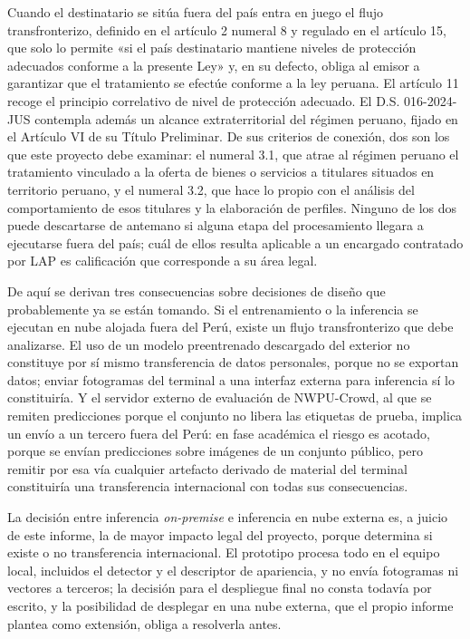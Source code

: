 Cuando el destinatario se sitúa fuera del país entra en juego el flujo
transfronterizo, definido en el artículo 2 numeral 8 y regulado en el
artículo 15, que solo lo permite «si el país destinatario mantiene
niveles de protección adecuados conforme a la presente Ley» y, en su
defecto, obliga al emisor a garantizar que el tratamiento se efectúe
conforme a la ley peruana. El artículo 11 recoge el principio
correlativo de nivel de protección adecuado. El D.S. 016-2024-JUS
contempla además un alcance extraterritorial del régimen peruano, fijado
en el Artículo VI de su Título Preliminar. De sus criterios de conexión,
dos son los que este proyecto debe examinar: el numeral 3.1, que atrae
al régimen peruano el tratamiento vinculado a la oferta de bienes o
servicios a titulares situados en territorio peruano, y el numeral 3.2,
que hace lo propio con el análisis del comportamiento de esos titulares
y la elaboración de perfiles. Ninguno de los dos puede descartarse de
antemano si alguna etapa del procesamiento llegara a ejecutarse fuera
del país; cuál de ellos resulta aplicable a un encargado contratado por
LAP es calificación que corresponde a su área legal.

De aquí se derivan tres consecuencias sobre decisiones de diseño que
probablemente ya se están tomando. Si el entrenamiento o la inferencia
se ejecutan en nube alojada fuera del Perú, existe un flujo
transfronterizo que debe analizarse. El uso de un modelo preentrenado
descargado del exterior no constituye por sí mismo transferencia de
datos personales, porque no se exportan datos; enviar fotogramas del
terminal a una interfaz externa para inferencia sí lo constituiría. Y el
servidor externo de evaluación de NWPU-Crowd, al que se remiten
predicciones porque el conjunto no libera las etiquetas de prueba,
implica un envío a un tercero fuera del Perú: en fase académica el
riesgo es acotado, porque se envían predicciones sobre imágenes de un
conjunto público, pero remitir por esa vía cualquier artefacto derivado
de material del terminal constituiría una transferencia internacional
con todas sus consecuencias.

La decisión entre inferencia \emph{on-premise} e inferencia en nube
externa es, a juicio de este informe, la de mayor impacto legal del
proyecto, porque determina si existe o no transferencia internacional.
El prototipo procesa todo en el equipo local, incluidos el detector y el
descriptor de apariencia, y no envía fotogramas ni vectores a terceros; la
decisión para el despliegue final no consta todavía por escrito, y la
posibilidad de desplegar en una nube externa, que el propio informe plantea
como extensión, obliga a resolverla antes.

